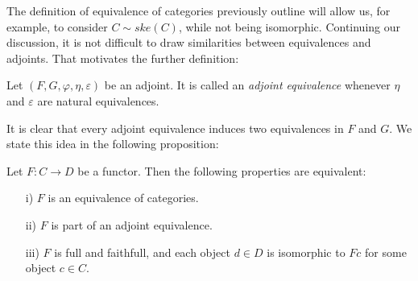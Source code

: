   The definition of equivalence of categories previously outline will allow us, for example, to consider $C\sim ske(C)$, while not being isomorphic. Continuing our discussion, it is not difficult to draw similarities between equivalences and adjoints. That motivates the further definition:
  \begin{definition}
    Let $(F,G,\varphi,\eta,\varepsilon)$ be an adjoint. It is called an \emph{adjoint equivalence} whenever $\eta$ and $\varepsilon$ are natural equivalences.
  \end{definition}
  It is clear that every adjoint equivalence induces two equivalences in $F$ and $G$. We state this idea in the following proposition:
  \begin{proposition}\cite[Theorem 1, 4.4]{mac2013categories}
    Let $F:C\to D$ be a functor. Then the following properties are equivalent:
    \begin{itemize}
    \item[i)] $F$ is an equivalence of categories.
    \item[ii)] $F$ is part of an adjoint equivalence. 
    \item[iii)] $F$ is full and faithfull, and each object $d\in D$ is isomorphic to $Fc$ for some object $c\in C$.  
    \end{itemize}  
  \end{proposition}
